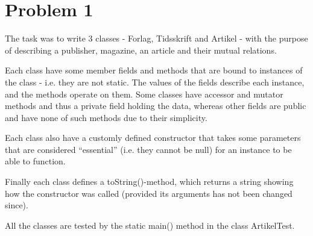 \section*{Problem 1}
The task was to write 3 classes - Forlag, Tidsskrift and Artikel -
with the purpose of describing a publisher, magazine, an article and their mutual relations.

Each class have some member fields and methods that are bound to instances of the class - i.e. they are not static. The values of the fields describe each instance, and the methods operate on them.
Some classes have accessor and mutator methods and thus a private field holding the data, whereas
other fields are public and have none of such methods due to their simplicity.

Each class also have a customly defined constructor that takes some parameters that are considered
``essential'' (i.e. they cannot be null) for an instance to be able to function.

Finally each class defines a toString()-method, which returns a string showing how the constructor
was called (provided its arguments has not been changed since).

All the classes are tested by the static main() method in the class ArtikelTest.
